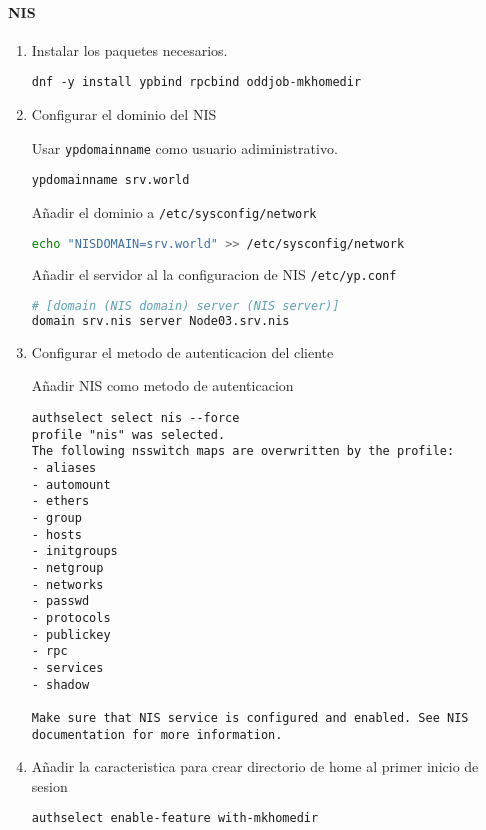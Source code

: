 \documentclass[../main.tex]{subfiles}
\begin{document}
\paragraph{NIS}
\begin{enumerate}
\item Instalar los paquetes necesarios.
  \begin{lstlisting}
dnf -y install ypbind rpcbind oddjob-mkhomedir
\end{lstlisting}

\item Configurar el dominio del NIS

  Usar \lstinline|ypdomainname| como usuario adiministrativo.
  \begin{lstlisting}
ypdomainname srv.world
\end{lstlisting}
  Añadir el dominio a \lstinline|/etc/sysconfig/network|
  \begin{lstlisting}[language=bash,label={list:sysnetwork},caption=Modificación del archivo /etc/sysconfig/network]
echo "NISDOMAIN=srv.world" >> /etc/sysconfig/network 
\end{lstlisting}
  Añadir el servidor al la configuracion de NIS \lstinline|/etc/yp.conf|
  \begin{lstlisting}[language=bash,label={list:yp},caption=Modificación del archivo /etc/yp.conf]
# [domain (NIS domain) server (NIS server)]
domain srv.nis server Node03.srv.nis 
\end{lstlisting}
     
\item Configurar el metodo de autenticacion del cliente
 
  Añadir NIS como metodo de autenticacion
\lstset{style=nonestyle}
  \begin{lstlisting}
authselect select nis --force
profile "nis" was selected.
The following nsswitch maps are overwritten by the profile:
- aliases
- automount
- ethers
- group
- hosts
- initgroups
- netgroup
- networks
- passwd
- protocols
- publickey
- rpc
- services
- shadow

Make sure that NIS service is configured and enabled. See NIS documentation for more information.
\end{lstlisting}

\item Añadir la caracteristica para crear directorio de home al
  primer inicio de sesion
\lstset{style=mystyle}
  \begin{lstlisting}
authselect enable-feature with-mkhomedir   
\end{lstlisting}


\end{enumerate}
\end{document}
